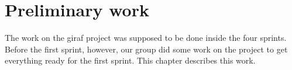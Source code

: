 \chapter{Preliminary work}

The work on the \gls{giraf} project was supposed to be done inside the four sprints. Before the first sprint, however, our group did some work on the project to get everything ready for the first sprint. This chapter describes this work.